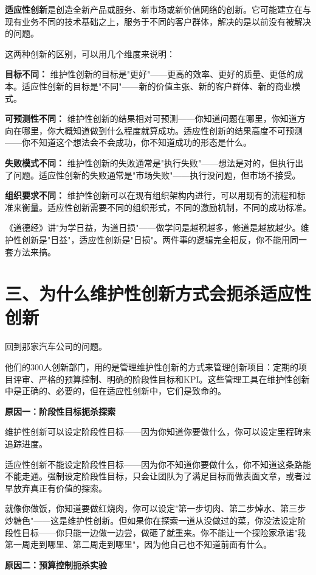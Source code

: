 \textbf{适应性创新}是创造全新产品或服务、新市场或新价值网络的创新。它可能建立在与现有业务不同的技术基础之上，服务于不同的客户群体，解决的是以前没有被解决的问题。

这两种创新的区别，可以用几个维度来说明：

\textbf{目标不同：} 维护性创新的目标是"更好"——更高的效率、更好的质量、更低的成本。适应性创新的目标是"不同"——新的价值主张、新的客户群体、新的商业模式。

\textbf{可预测性不同：} 维护性创新的结果相对可预测——你知道问题在哪里，你知道方向在哪里，你大概知道做到什么程度就算成功。适应性创新的结果高度不可预测——你不知道这个想法会不会成功，你不知道成功的形态是什么。

\textbf{失败模式不同：} 维护性创新的失败通常是"执行失败"——想法是对的，但执行出了问题。适应性创新的失败通常是"市场失败"——执行没问题，但市场不接受。

\textbf{组织要求不同：} 维护性创新可以在现有组织架构内进行，可以用现有的流程和标准来衡量。适应性创新需要不同的组织形式，不同的激励机制，不同的成功标准。

《道德经》讲"为学日益，为道日损"——做学问是越积越多，修道是越放越少。维护性创新是"日益"，适应性创新是"日损"。两件事的逻辑完全相反，你不能用同一套方法来搞。

\section{三、为什么维护性创新方式会扼杀适应性创新}


回到那家汽车公司的问题。

他们的300人创新部门，用的是管理维护性创新的方式来管理创新项目：定期的项目评审、严格的预算控制、明确的阶段性目标和KPI。这些管理工具在维护性创新中是正确的、必要的，但在适应性创新中，它们是致命的。

\textbf{原因一：阶段性目标扼杀探索}

维护性创新可以设定阶段性目标——因为你知道你要做什么，你可以设定里程碑来追踪进度。

适应性创新不能设定阶段性目标——因为你不知道你要做什么，你不知道这条路能不能走通。强制设定阶段性目标，只会让团队为了满足目标而做表面文章，或者过早放弃真正有价值的探索。

就像你做饭，你知道要做红烧肉，你可以设定"第一步切肉、第二步焯水、第三步炒糖色"——这是维护性创新。但如果你在探索一道从没做过的菜，你没法设定阶段性目标——你只能一边做一边尝，做砸了就重来。你不能让一个探险家承诺"我第一周走到哪里、第二周走到哪里"，因为他自己也不知道前面有什么。

\textbf{原因二：预算控制扼杀实验}

